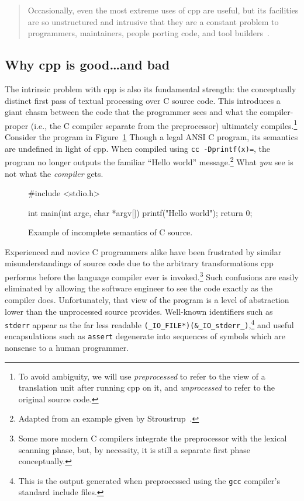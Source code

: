 \documentclass{article}
\newcommand{\Cpp}{\mbox{\textsf{cpp}}}
\newcommand{\C}{\mbox{\textsf{C}}}
\newcommand{\ie}{i.e.,}
\newcommand{\figref}[1]{Figure~\ref{#1}}
\begin{document}
\begin{quotation}
\noindent Occasionally, even the most extreme uses of \Cpp{} are useful, but its
facilities are so unstructured and intrusive that they are a constant
problem to programmers, maintainers, people porting code, and tool
builders~\cite[p.~424]{Stroustrup94}.
\end{quotation}

\subsection{Why \Cpp{} is good\ldots and bad}

The intrinsic problem with \Cpp{} is also its fundamental strength: the
conceptually distinct first pass of textual processing over \C{} source
code.  This introduces a giant chasm between the code that the
programmer sees and what the compiler-proper (\ie{} the \C{} compiler
separate from the preprocessor) ultimately compiles.\footnote{To avoid
  ambiguity, we will use \emph{preprocessed} to refer to the view of a
  translation unit after running \Cpp{} on it, and \emph{unprocessed} to
  refer to the original source code.} Consider the program in
\figref{fig:badmain} Though a legal ANSI \C{} program, its semantics are
undefined in light of \Cpp{}.  When compiled using \texttt{cc
  -Dprintf(x)=}, the program no longer outputs the familiar ``Hello
world'' message.\footnote{Adapted from an example given by
  Stroustrup~\cite[p.~423]{Stroustrup94}.}  What \emph{you} see is not what the
\emph{compiler} gets.

\begin{figure}[hbt]
\begin{center}
\begin{small}
\begin{pseudocode}[3in]
#include <stdio.h>

int main(int argc, char *argv[]) {
  printf("Hello world");
  return 0;
}
\end{pseudocode}
\end{small}
\caption{Example of incomplete semantics of \C{} source.}
\label{fig:badmain}
\end{center}
\end{figure}

Experienced and novice \C{} programmers alike have been frustrated by
similar misunderstandings of source code due to the arbitrary
transformations \Cpp{} performs before the language compiler ever is
invoked.\footnote{Some more modern \C{} compilers integrate the
  preprocessor with the lexical scanning phase, but, by necessity, it is
  still a separate first phase conceptually.}  Such confusions are
easily eliminated by allowing the software engineer to see the code
exactly as the compiler does.  Unfortunately, that view of the program
is a level of abstraction lower than the unprocessed source provides.
Well-known identifiers such as \texttt{stderr} appear as the far less
readable \texttt{(\_IO\_FILE*)(\&\_IO\_stderr\_)},\footnote{This is the
  output generated when preprocessed using the \texttt{gcc} compiler's
  standard include files.} and useful encapsulations such as
\texttt{assert} degenerate into sequences of symbols which are nonsense
to a human programmer.
\end{document}

